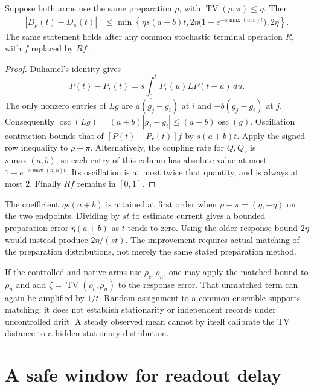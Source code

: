 \begin{theorem}
\label{robustphysics:preparation}
Suppose both arms use the same preparation $\rho$, with
$\operatorname{TV}(\rho,\pi)\le\eta$. Then
\begin{align}
 |D_\rho(t)-D_\pi(t)|
 &\le\min\left\{
 \eta s(a+b)t,
 2\eta\bigl(1-e^{-s\max(a,b)t}\bigr),2\eta\right\}.
 \label{robustphysics:preparationbound}
\end{align}
The same statement holds after any common stochastic terminal operation $R$,
with $f$ replaced by $Rf$.
\end{theorem}

\begin{proof}
Duhamel's identity gives
\[
 P(t)-P_r(t)=s\int_0^tP_r(u)L P(t-u)\,du.
\]
The only nonzero entries of $Lg$ are $a(g_j-g_i)$ at $i$ and
$-b(g_j-g_i)$ at $j$. Consequently
$\operatorname{osc}(Lg)=(a+b)|g_j-g_i|\le(a+b)\operatorname{osc}(g)$.
Oscillation contraction bounds that of $[P(t)-P_r(t)]f$ by $s(a+b)t$.
Apply the signed-row inequality to $\rho-\pi$. Alternatively, the coupling
rate for $Q,Q_r$ is $s\max(a,b)$, so each entry of this column has absolute
value at most $1-e^{-s\max(a,b)t}$. Its oscillation is at most twice that
quantity, and is always at most $2$. Finally $Rf$ remains in $[0,1]$.
\end{proof}

The coefficient $\eta s(a+b)$ is attained at first order when
$\rho-\pi=(\eta,-\eta)$ on the two endpoints. Dividing by $st$ to
estimate current gives a bounded preparation error $\eta(a+b)$ as $t$ tends
to zero. Using the older response bound $2\eta$ would instead produce
$2\eta/(st)$. The improvement requires actual matching of the preparation
distributions, not merely the same stated preparation method.

If the controlled and native arms use $\rho_c,\rho_n$, one may apply the
matched bound to $\rho_n$ and add
$\zeta=\operatorname{TV}(\rho_c,\rho_n)$ to the response error. That
unmatched term can again be amplified by $1/t$. Random assignment to a common
ensemble supports matching; it does not establish stationarity or independent
records under uncontrolled drift. A steady observed mean cannot by itself
calibrate the TV distance to a hidden stationary distribution.

\section{A safe window for readout delay}

